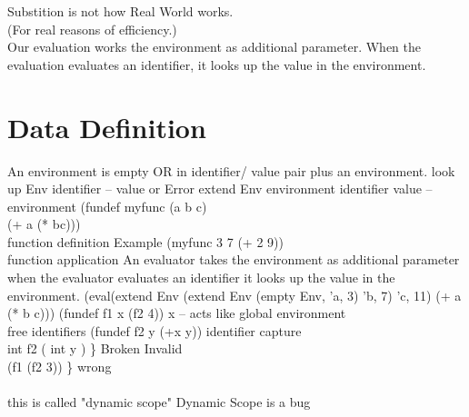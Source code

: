 \documentclass{article}
\begin{document}
 Substition is not how Real World works. \\
 (For real reasons of efficiency.) \\
\newline
\newline
Our evaluation works the environment as additional parameter. When the evaluation evaluates an identifier, it looks up the value in the environment.
\newline
\newline
\section{Data Definition}
An environment is empty OR in identifier/ value pair plus an environment.
\newline
\newline
look up Env identifier -- value or Error
\newline
\newline
extend Env environment identifier value -- environment
\newline
\newline
(fundef myfunc (a b c)\\
(+ a (* bc))) \\
function definition
\newline
\newline
Example 
\newline
(myfunc 3 7 (+ 2 9))\\
function application
\newline
\newline
An evaluator takes the environment as additional parameter when the evaluator evaluates an identifier it looks up the value in the environment.
\newline
\newline
(eval(extend Env (extend Env (empty Env, 'a, 3) 'b, 7) 'c, 11) (+ a (* b c)))
\newline
\newline
(fundef f1 x (f2 4))   x -- acts like global environment \\     free identifiers
\newline
\newline
(fundef f2 y (+x y))    identifier capture   \\
 int f2 ( int y ) \} Broken Invalid \\ 
 (f1 (f2 3)) \} wrong
 \\
\\
this is called "dynamic scope" Dynamic Scope is a bug
\end{document}
